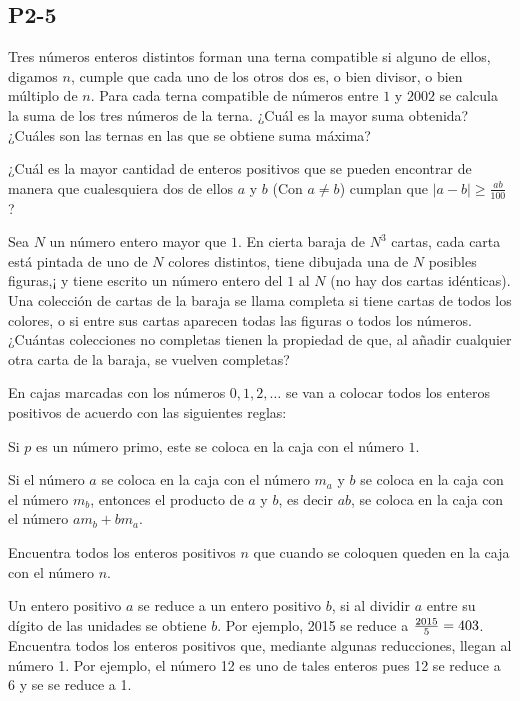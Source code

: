 \documentclass[11pt]{scrartcl}
\begin{document}
\subsection{P2-5}
\begin{problem}
    [2002/5]
    Tres números enteros distintos forman una terna compatible si alguno de ellos, digamos $n$, cumple que cada uno de los otros dos es, o bien divisor, o bien múltiplo de $n$. Para cada terna compatible de números entre $1$ y $2002$ se calcula la suma de los tres números de la terna. ¿Cuál es la mayor suma obtenida? ¿Cuáles son las ternas en las que se obtiene suma máxima?
\end{problem}
\begin{problem}
    [2004/2]
    ¿Cuál es la mayor cantidad de enteros positivos que se pueden encontrar de manera que cualesquiera dos de ellos $a$ y $b$ (Con $a\neq b$) cumplan que $\left| a-b \right|\geq \frac{ab}{100}$?
\end{problem}
\begin{problem}
    [2005/5]
    Sea $N$ un número entero mayor que $1$. En cierta baraja de $N^3$ cartas, cada carta está pintada de uno de $N$ colores distintos, tiene dibujada una de $N$ posibles figuras,¡ y tiene escrito un número entero del $1$ al $N$ (no hay dos cartas idénticas). Una colección de cartas de la baraja se llama completa si tiene cartas de todos los colores, o si entre sus cartas aparecen todas las figuras o todos los números. ¿Cuántas colecciones no completas tienen la propiedad de que, al añadir cualquier otra carta de la baraja, se vuelven completas?
\end{problem}
\begin{problem}
    [2009/2] 
    En cajas marcadas con los números $0,1,2,\dots$ se van a colocar todos los enteros positivos de acuerdo con las siguientes reglas:

Si $p$ es un número primo, este se coloca en la caja con el número $1$. 

Si el número $a$ se coloca en la caja con el número $m_a$ y $b$ se coloca en la caja con el número $m_b$, entonces el producto de $a$ y $b$, es decir $ab$, se coloca en la caja con el número $am_b+bm_a$.

Encuentra todos los enteros positivos $n$ que cuando se coloquen queden en la caja con el número $n$.
\end{problem}
\begin{problem}
[2014/2]Un entero positivo $a$ se reduce a un entero positivo $b$, si al dividir $a$ entre su dígito de las unidades se obtiene $b$. Por ejemplo, 2015 se reduce a ${2015 \over 5} = 403$. Encuentra todos los enteros positivos que, mediante algunas reducciones, llegan al número 1. Por ejemplo, el número 12 es uno de tales enteros pues 12 se reduce a 6 y se se reduce a 1.
\end{problem}
\end{document}

